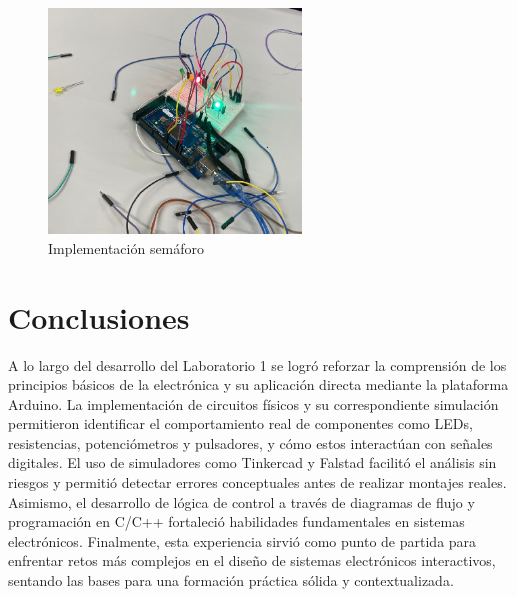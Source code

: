 \documentclass{article}
\begin{document}
\begin{figure}[H]
    \centering
    \includegraphics[width=0.6\textwidth]{./img/semaforo.png}
    \caption{Implementación semáforo}
    \label{fig:implementacion_semaforo}
\end{figure}

\section{Conclusiones}

A lo largo del desarrollo del Laboratorio 1 se logró reforzar la comprensión de los principios básicos de la electrónica y su aplicación directa mediante la plataforma Arduino. La implementación de circuitos físicos y su correspondiente simulación permitieron identificar el comportamiento real de componentes como LEDs, resistencias, potenciómetros y pulsadores, y cómo estos interactúan con señales digitales. El uso de simuladores como Tinkercad y Falstad facilitó el análisis sin riesgos y permitió detectar errores conceptuales antes de realizar montajes reales. Asimismo, el desarrollo de lógica de control a través de diagramas de flujo y programación en C/C++ fortaleció habilidades fundamentales en sistemas electrónicos. Finalmente, esta experiencia sirvió como punto de partida para enfrentar retos más complejos en el diseño de sistemas electrónicos interactivos, sentando las bases para una formación práctica sólida y contextualizada.




\end{document}
